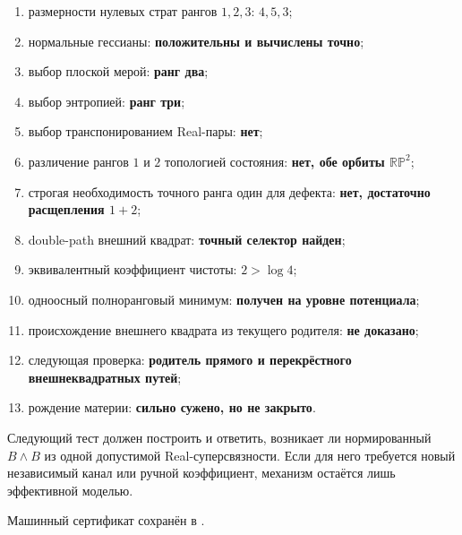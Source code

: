 \begin{protocol}
\begin{enumerate}
 \item размерности нулевых страт рангов $1,2,3$:
 \textbf{$4,5,3$};
 \item нормальные гессианы: \textbf{положительны и вычислены точно};
 \item выбор плоской мерой: \textbf{ранг два};
 \item выбор энтропией: \textbf{ранг три};
 \item выбор транспонированием Real-пары: \textbf{нет};
 \item различение рангов $1$ и $2$ топологией состояния:
 \textbf{нет, обе орбиты $\mathbb{RP}^2$};
 \item строгая необходимость точного ранга один для дефекта:
 \textbf{нет, достаточно расщепления $1+2$};
 \item double-path внешний квадрат: \textbf{точный селектор найден};
 \item эквивалентный коэффициент чистоты: \textbf{$2>\log4$};
 \item одноосный полноранговый минимум: \textbf{получен на уровне потенциала};
 \item происхождение внешнего квадрата из текущего родителя:
 \textbf{не доказано};
 \item следующая проверка:
 \textbf{родитель прямого и перекрёстного внешнеквадратных путей};
 \item рождение материи: \textbf{сильно сужено, но не закрыто}.
\end{enumerate}
\end{protocol}

Следующий тест должен построить
 и
ответить, возникает ли нормированный $B\wedge B$ из одной допустимой
Real-суперсвязности. Если для него требуется новый независимый канал или
ручной коэффициент, механизм остаётся лишь эффективной моделью.

Машинный сертификат сохранён в
.